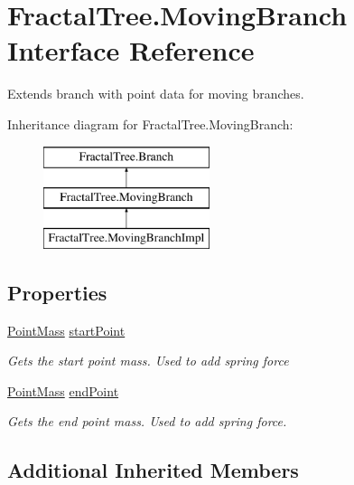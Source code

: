 \hypertarget{interface_fractal_tree_1_1_moving_branch}{}\section{Fractal\+Tree.\+Moving\+Branch Interface Reference}
\label{interface_fractal_tree_1_1_moving_branch}


Extends branch with point data for moving branches.  


Inheritance diagram for Fractal\+Tree.\+Moving\+Branch\+:\begin{figure}[H]
\begin{center}
\leavevmode
\includegraphics[height=3.000000cm]{interface_fractal_tree_1_1_moving_branch}
\end{center}
\end{figure}
\subsection*{Properties}
\begin{DoxyCompactItemize}
\item 
\hyperlink{class_fractal_tree_1_1_point_mass}{Point\+Mass} \hyperlink{interface_fractal_tree_1_1_moving_branch_afbf74eadb94a987e4f845e77b8d0b964}{start\+Point}
\begin{DoxyCompactList}\small\item\em Gets the start point mass. Used to add spring force \end{DoxyCompactList}\item 
\hyperlink{class_fractal_tree_1_1_point_mass}{Point\+Mass} \hyperlink{interface_fractal_tree_1_1_moving_branch_a232ab0d1d87bb5a0abc5c54d4f26fe2b}{end\+Point}
\begin{DoxyCompactList}\small\item\em Gets the end point mass. Used to add spring force. \end{DoxyCompactList}\end{DoxyCompactItemize}
\subsection*{Additional Inherited Members}


